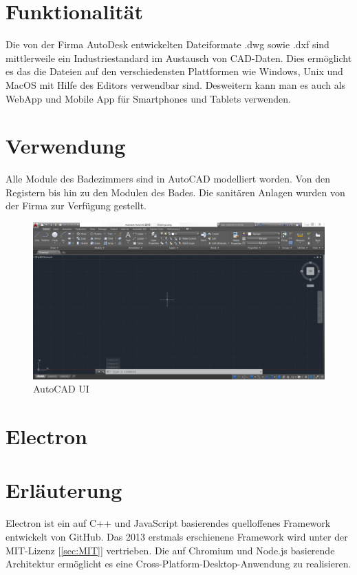 \section*{Funktionalität}
Die von der Firma AutoDesk entwickelten Dateiformate .dwg sowie .dxf sind mittlerweile ein Industriestandard im Austausch von CAD-Daten. Dies ermöglicht es das die Dateien auf den verschiedensten Plattformen wie Windows, Unix und MacOS mit Hilfe des Editors verwendbar sind. Desweitern kann man es auch als WebApp und Mobile App für Smartphones und Tablets verwenden.

\section*{Verwendung}
Alle Module des Badezimmers sind in AutoCAD modelliert worden. Von den Registern bis hin zu den Modulen des Bades. Die sanitären Anlagen wurden von der Firma {\projectpartner} zur Verfügung gestellt.



\newpage

\begin{figure}
	\begin{center}
		\includegraphics[width=16cm]{images/AutoCAD_UI.jpg}
		\caption{AutoCAD UI ~\cite{autocad}}
	\end{center}
\end{figure}


\newpage
\clearpage

\section{Electron}\label{sec:Electron}



\section*{Erläuterung}
Electron ist ein auf C++ und JavaScript basierendes quelloffenes Framework entwickelt von GitHub. Das 2013 erstmals erschienene Framework wird unter der MIT-Lizenz [\ref{sec:MIT}] vertrieben. Die auf Chromium und Node.js basierende Architektur ermöglicht es eine Cross-Platform-Desktop-Anwendung zu realisieren.

